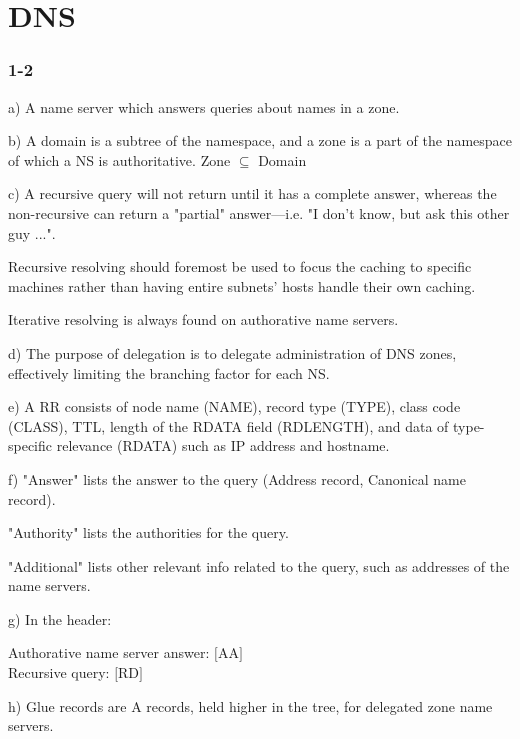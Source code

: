 
\chapter{DNS}
\subsection{1-2}
a) A name server which answers queries about names in a zone.

b) A domain is a subtree of the namespace, and a zone is a part of the namespace of which a NS is authoritative. Zone $\subseteq$ Domain

c) A recursive query will not return until it has a complete answer, whereas the non-recursive can return a "partial" answer---i.e. "I don't know, but ask this other guy ...".

Recursive resolving should foremost be used to focus the caching to specific machines rather than having entire subnets' hosts handle their own caching.

Iterative resolving is always found on authorative name servers.

d) The purpose of delegation is to delegate administration of DNS zones, effectively limiting the branching factor for each NS.

e) A RR consists of node name (NAME), record type (TYPE), class code (CLASS), TTL, length of the RDATA field (RDLENGTH), and data of type-specific relevance (RDATA) such as IP address and hostname.

f) "Answer" lists the answer to the query (Address record, Canonical name record).

"Authority" lists the authorities for the query.

"Additional" lists other relevant info related to the query, such as addresses of the name servers.

g) In the header:

  Authorative name server answer: $[$AA$]$\\
  Recursive query: $[$RD$]$

h) Glue records are A records, held higher in the tree, for delegated zone name servers.



